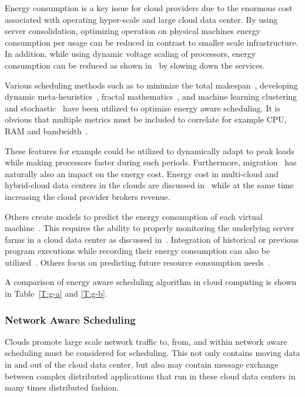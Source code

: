 \documentclass[final,5p,times,twocolumn]{elsarticle}
\begin{document}
Energy consumption is a key issue for cloud providers due to the
enormous cost associated with operating hyper-scale and large cloud
data center. By using server consolidation, optimizing operation on
physical machines energy consumption per usage can be reduced in
contrast to smaller scale infrastructure.  In addition, while using
dynamic voltage scaling of processors, energy consumption can be
reduced as shown in~\cite{las09dvfs,las10dvfs,calheiros2014energy} by
slowing down the services.

Various scheduling methods such as to minimize the total
makespan~\cite{bessis2013using}, developing dynamic
meta-heuristics~\cite{bi2017application}, fractal
mathematics~\cite{duan2016energy}, and machine learning clustering and
stochastic~\cite{bui2017energy} have been utilized to optimize energy
aware scheduling. It is obvious that multiple metrics must be included to correlate for
example CPU, RAM and bandwidth~\cite{zhu2017three}.

These features for example could be utilized to dynamically adapt to
peak loads~\cite{duan2016energy} while making processors faster during
such periods.  Furthermore, migration~\cite{beloglazov2010energy} has
naturally also an impact on the energy cost.  Energy cost in
multi-cloud and hybrid-cloud data centers in the clouds are discussed
in~\cite{quarati2013hybrid,garg2011environment,gai2016dynamic,2015energy} while
at the same time increasing the cloud provider brokers revenue.


Others create models to predict the energy consumption of each virtual
machine~\cite{kim2014energy}. This requires the ability to properly
monitoring the underlying server farms in a cloud data center as
discussed in~\cite{van2012comparison}. Integration of historical or
previous program executions while recording their energy consumption
can also be utilized~\cite{hu2010scheduling}. Others focus on
predicting future resource consumption needs~\cite{dabbagh2015energy}.

A comparison of energy aware scheduling algorithm in cloud computing is shown in
Table~\ref{T:g-a} and \ref{T:g-b}.



%

\subsubsection{Network Aware Scheduling}\label{sec:network}


Clouds promote large scale network traffic to, from, and within
network aware scheduling must be considered for scheduling.  This not
only contains moving data in and out of the cloud data center, but
also may contain message exchange between complex distributed
applications that run in these cloud data centers in many times
distributed fashion.
\end{document}
